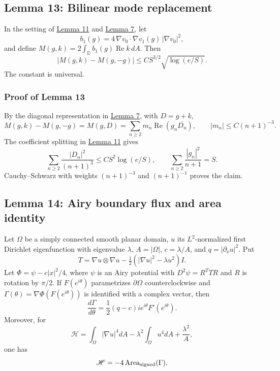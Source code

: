 \documentclass[11pt]{article}
\begin{document}
\subsection{Lemma 13: Bilinear mode
replacement}\label{lem-bilinear-mode-replacement}

In the setting of \hyperref[lem-frequency-replacement]{Lemma 11} and
\hyperref[lem-gradient-perturbation]{Lemma 7}, let \[
b_1(g)=4\,\nabla v_0\cdot\nabla v_1(g)\,|\nabla v_0|^2,
\] and define \(M(g,k)=2\int_{\mathbb D}b_1(g)\operatorname{Re}k\,dA\).
Then \[
|M(g,k)-M(g,-g)|\le C S^{3/2}\sqrt{\log(e/S)}.
\] The constant is universal.

\subsubsection{Proof of Lemma
13}\label{proof-lem-bilinear-mode-replacement}

By the diagonal representation in
\hyperref[lem-gradient-perturbation]{Lemma 7}, with \(D=g+k\), \[
M(g,k)-M(g,-g)=M(g,D)=\sum_{n\ge2}m_n\operatorname{Re}(g_n\overline{D_n}),
\qquad |m_n|\le C(n+1)^{-3}.
\] The coefficient splitting in
\hyperref[lem-frequency-replacement]{Lemma 11} gives \[
\sum_{n\ge2}\frac{|D_n|^2}{(n+1)^3}\le CS^2\log(e/S),
\qquad \sum_{n\ge2}\frac{|g_n|^2}{n+1}=S.
\] Cauchy--Schwarz with weights \((n+1)^{-3}\) and \((n+1)^{-1}\) proves
the claim.

\subsection{Lemma 14: Airy boundary flux and area
identity}\label{lem-airy-boundary-flux}

Let \(\Omega\) be a simply connected smooth planar domain, \(u\) its
\(L^2\)-normalized first Dirichlet eigenfunction with eigenvalue
\(\lambda\), \(A=|\Omega|\), \(c=\lambda/A\), and
\(q=|\partial_\nu u|^2\). Put \[
T=\nabla u\otimes\nabla u-\tfrac12(|\nabla u|^2-\lambda u^2)I.
\] Let \(\Phi=\psi-c|x|^2/4\), where \(\psi\) is an Airy potential with
\(D^2\psi=R^TTR\) and \(R\) is rotation by \(\pi/2\). If
\(F(e^{i\theta})\) parametrizes \(\partial\Omega\) counterclockwise and
\(\Gamma(\theta)=\nabla\Phi(F(e^{i\theta}))\) is identified with a
complex vector, then \[
\frac{d\Gamma}{d\theta}=\frac12(q-c)i e^{i\theta}F'(e^{i\theta}).
\] Moreover, for \[
\mathscr H=\int_\Omega|\nabla u|^4dA-\lambda^2\int_\Omega u^4dA+\frac{\lambda^2}{A},
\] one has \[
\mathscr H=-4\operatorname{Area}_{\rm signed}(\Gamma).
\]
\end{document}
